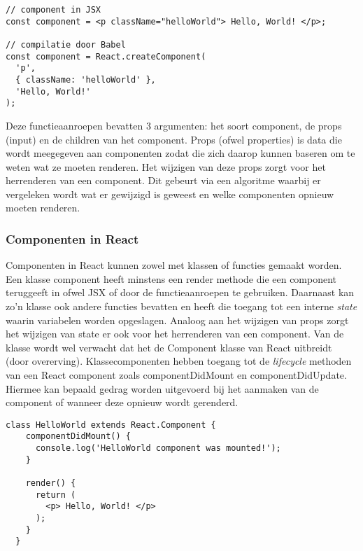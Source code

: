 \begin{lstlisting}[caption=JSX compilatie]
// component in JSX
const component = <p className="helloWorld"> Hello, World! </p>;  

// compilatie door Babel
const component = React.createComponent(
  'p',
  { className: 'helloWorld' },
  'Hello, World!'
);
\end{lstlisting}

Deze functieaanroepen bevatten 3 argumenten: het soort component, de props (input) en de children van het component. Props (ofwel properties) is data die wordt meegegeven aan componenten zodat die zich daarop kunnen baseren om te weten wat ze moeten renderen. Het wijzigen van deze props zorgt voor het herrenderen van een component. Dit gebeurt via een algoritme waarbij er vergeleken wordt wat er gewijzigd is geweest en welke componenten opnieuw moeten renderen. 

\subsubsection{Componenten in React}
Componenten in React kunnen zowel met klassen of functies gemaakt worden. Een klasse component heeft minstens een render methode die een component teruggeeft in ofwel JSX of door de functieaanroepen te gebruiken.  Daarnaast kan zo'n klasse ook andere functies bevatten en heeft die toegang tot een interne \textit{state} waarin variabelen worden opgeslagen. Analoog aan het wijzigen van props zorgt het wijzigen van state er ook voor het herrenderen van een component. Van de klasse wordt wel verwacht dat het de Component klasse van React uitbreidt (door overerving). Klassecomponenten hebben toegang tot de \textit{lifecycle} methoden van een React component zoals componentDidMount en componentDidUpdate. Hiermee kan bepaald gedrag worden uitgevoerd bij het aanmaken van de component of wanneer deze opnieuw wordt gerenderd.

\begin{lstlisting}[caption=Klassecomponent]
  class HelloWorld extends React.Component {
    componentDidMount() {
      console.log('HelloWorld component was mounted!');
    }

    render() {
      return (
        <p> Hello, World! </p>
      );
    }
  }
\end{lstlisting}

